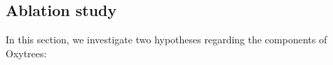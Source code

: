 \documentclass[sn-mathphys-num]{sn-jnl}%
\theoremstyle{thmstyleone}%
\theoremstyle{thmstyletwo}%
\theoremstyle{thmstylethree}%
\begin{document}






\subsection{Ablation study}
\label{sec:ablation}

In this section, we investigate two hypotheses regarding the components of Oxytrees:


\end{document}
